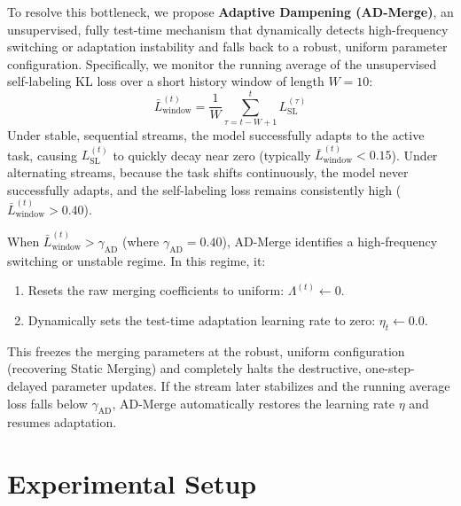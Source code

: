 \documentclass{article}
\theoremstyle{plain}
\theoremstyle{definition}
\theoremstyle{remark}
\begin{document}
To resolve this bottleneck, we propose \textbf{Adaptive Dampening (AD-Merge)}, an unsupervised, fully test-time mechanism that dynamically detects high-frequency switching or adaptation instability and falls back to a robust, uniform parameter configuration. Specifically, we monitor the running average of the unsupervised self-labeling KL loss over a short history window of length $W = 10$:
\begin{equation}
    \bar{L}_{\text{window}}^{(t)} = \frac{1}{W} \sum_{\tau=t-W+1}^t L_{\text{SL}}^{(\tau)}
\end{equation}
Under stable, sequential streams, the model successfully adapts to the active task, causing $L_{\text{SL}}^{(t)}$ to quickly decay near zero (typically $\bar{L}_{\text{window}}^{(t)} < 0.15$). Under alternating streams, because the task shifts continuously, the model never successfully adapts, and the self-labeling loss remains consistently high ($\bar{L}_{\text{window}}^{(t)} > 0.40$).

When $\bar{L}_{\text{window}}^{(t)} > \gamma_{\text{AD}}$ (where $\gamma_{\text{AD}} = 0.40$), AD-Merge identifies a high-frequency switching or unstable regime. In this regime, it:
\begin{enumerate}
    \item Resets the raw merging coefficients to uniform: $\Lambda^{(t)} \leftarrow 0$.
    \item Dynamically sets the test-time adaptation learning rate to zero: $\eta_t \leftarrow 0.0$.
\end{enumerate}
This freezes the merging parameters at the robust, uniform configuration (recovering Static Merging) and completely halts the destructive, one-step-delayed parameter updates. If the stream later stabilizes and the running average loss falls below $\gamma_{\text{AD}}$, AD-Merge automatically restores the learning rate $\eta$ and resumes adaptation.

\section{Experimental Setup}
\label{experimental_setup}
\end{document}
